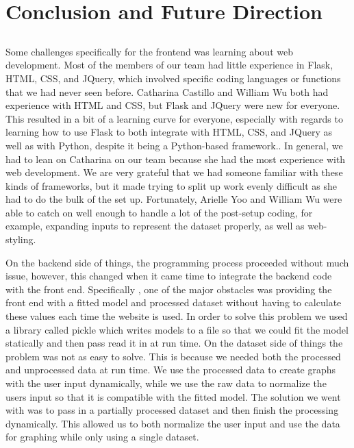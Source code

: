 \documentclass[12pt]{article}
\begin{document}
\section*{Conclusion and Future Direction}
\subsection*{}
\hspace{\parindent} Some challenges specifically for the frontend was learning about web development. Most of the members of our team had little experience in Flask, HTML, CSS, and JQuery, which involved specific coding languages or functions that we had never seen before. Catharina Castillo and William Wu both had experience with HTML and CSS, but Flask and JQuery were new for everyone. This resulted in a bit of a learning curve for everyone, especially with regards to learning how to use Flask to both integrate with HTML, CSS, and JQuery as well as with Python, despite it being a Python-based framework.. In general, we had to lean on Catharina on our team because she had the most experience with web development. We are very grateful that we had someone familiar with these kinds of frameworks, but it made trying to split up work evenly difficult as she had to do the bulk of the set up. Fortunately, Arielle Yoo and William Wu were able to catch on well enough to handle a lot of the post-setup coding, for example, expanding inputs to represent the dataset properly, as well as web-styling.
\par On the backend side of things, the programming process proceeded without much issue, however, this changed when it came time to integrate the backend code with the front end. Specifically , one of the major obstacles was providing the front end with a fitted model and processed dataset without having to calculate these values each time the website is used. In order to solve this problem we used a library called pickle which writes models to a file so that we could fit the model statically and then pass read it in at run time. On the dataset side of things the problem was not as easy to solve. This is because we needed both the processed and unprocessed data at run time. We use the processed data to create graphs with the user input dynamically, while we use the raw data to normalize the users input so that it is compatible with the fitted model. The solution we went with was to pass in a partially processed dataset and then finish the processing dynamically. This allowed us to both normalize the user input and use the data for graphing while only using a single dataset.  
\end{document}
